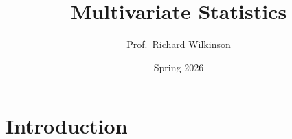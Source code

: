 \documentclass[
]{book}
\title{Multivariate Statistics}
\author{Prof.~Richard Wilkinson}
\date{Spring 2026}
\theoremstyle{definition}
\theoremstyle{definition}
\theoremstyle{definition}
\theoremstyle{definition}
\theoremstyle{remark}
\begin{document}
\maketitle

{
\setcounter{tocdepth}{1}
\tableofcontents
}
\chapter*{Introduction}\label{introduction}

\newcommand{\bmu}{{\boldsymbol{\mu}}}
\newcommand{\bSigma}{\boldsymbol{\Sigma}}
\newcommand{\bLambda}{\boldsymbol \Lambda}
\newcommand{\bgamma}{\boldsymbol \gamma}
\newcommand{\bGamma}{\boldsymbol \Gamma}
\newcommand{\btheta}{\boldsymbol \theta}
\newcommand{\bdelta}{\boldsymbol \delta}
\newcommand{\bbeta}{\boldsymbol \beta}
\newcommand{\blambda}{\boldsymbol \lambda}
\newcommand{\bepsilon}{\boldsymbol \epsilon}
\newcommand{\balpha}{\boldsymbol \alpha}

\newcommand{\bA}{\mathbf A}
\newcommand{\bB}{\mathbf B}
\newcommand{\bC}{\mathbf C}
\newcommand{\bD}{\mathbf D}
\newcommand{\bE}{\mathbf E}
\newcommand{\bF}{\mathbf F}
\newcommand{\bG}{\mathbf G}
\newcommand{\bH}{\mathbf H}
\newcommand{\bI}{\mathbf I}
\newcommand{\bL}{\mathbf L}
\newcommand{\bM}{\mathbf M}
\newcommand{\bP}{\mathbf P}
\newcommand{\bQ}{\mathbf Q}
\newcommand{\bR}{\mathbf R}
\newcommand{\mR}{\mathbb R}
\newcommand{\bS}{\mathbf S}
\newcommand{\bT}{\mathbf T}
\newcommand{\bV}{\mathbf V}
\newcommand{\bU}{\mathbf U}
\newcommand{\bW}{\mathbf W}
\newcommand{\bX}{\mathbf X}
\newcommand{\bY}{\mathbf Y}
\newcommand{\bZ}{\mathbf Z}
\newcommand{\rd}{\mathrm d}

\newcommand{\ba}{\mathbf a}
\newcommand{\bb}{\mathbf b}
\newcommand{\bc}{\mathbf c}
\newcommand{\bd}{\mathbf d}
\newcommand{\be}{\mathbf e}
\newcommand{\bg}{\mathbf g}
\newcommand{\bh}{\mathbf h}
\newcommand{\bk}{\mathbf k}
\newcommand{\bn}{\mathbf n}
\newcommand{\bp}{\mathbf p}
\newcommand{\bq}{\mathbf q}
\newcommand{\br}{\mathbf r}
\newcommand{\bt}{{\mathbf t}}
\newcommand{\bu}{\mathbf u}
\newcommand{\bv}{\mathbf v}
\newcommand{\bw}{\mathbf w}
\newcommand{\bx}{\mathbf x}
\newcommand{\by}{\mathbf y}
\newcommand{\bz}{\mathbf z}

\newcommand{\bzero}{{\boldsymbol 0}}

\newcommand{\cR}{\mathcal R}

\newcommand{\bs}{\boldsymbol}
\newcommand{\ds}{\displaystyle}
\newcommand{\tdiag}{\text{diag}}
\newcommand{\ttr}{\text{tr}}
\newcommand{\tmin}{\text{min}}
\newcommand{\tmax}{\text{max}}
\newcommand{\tdet}{\text{det}}
\newcommand{\tr}{\operatorname{tr}}
\newcommand{\indep}{\perp \!\!\! \perp}
\end{document}
